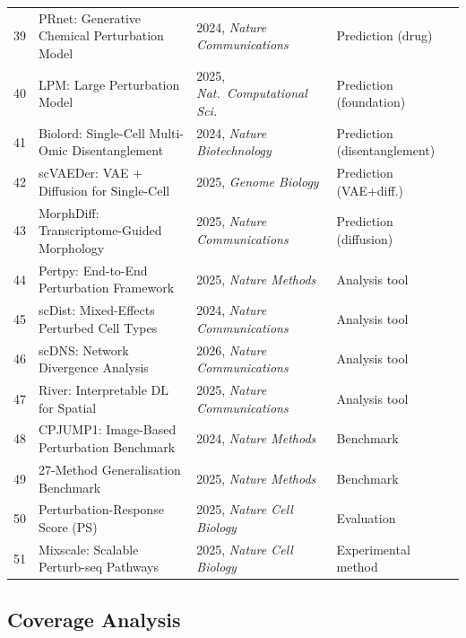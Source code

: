\documentclass[12pt, a4paper]{article}
\begin{document}
\begin{longtable}{@{}p{0.5cm}p{5.4cm}p{3.2cm}p{3.6cm}@{}}
39 & PRnet: Generative Chemical Perturbation Model & 2024, \textit{Nature Communications} & Prediction (drug) \\
40 & LPM: Large Perturbation Model                 & 2025, \textit{Nat.\ Computational Sci.} & Prediction (foundation) \\
41 & Biolord: Single-Cell Multi-Omic Disentanglement & 2024, \textit{Nature Biotechnology} & Prediction (disentanglement) \\
42 & scVAEDer: VAE $+$ Diffusion for Single-Cell   & 2025, \textit{Genome Biology}        & Prediction (VAE+diff.) \\
43 & MorphDiff: Transcriptome-Guided Morphology    & 2025, \textit{Nature Communications} & Prediction (diffusion) \\
44 & Pertpy: End-to-End Perturbation Framework     & 2025, \textit{Nature Methods}        & Analysis tool \\
45 & scDist: Mixed-Effects Perturbed Cell Types    & 2024, \textit{Nature Communications} & Analysis tool \\
46 & scDNS: Network Divergence Analysis            & 2026, \textit{Nature Communications} & Analysis tool \\
47 & River: Interpretable DL for Spatial           & 2025, \textit{Nature Communications} & Analysis tool \\
48 & CPJUMP1: Image-Based Perturbation Benchmark   & 2024, \textit{Nature Methods}        & Benchmark \\
49 & 27-Method Generalisation Benchmark            & 2025, \textit{Nature Methods}        & Benchmark \\
50 & Perturbation-Response Score (PS)              & 2025, \textit{Nature Cell Biology}   & Evaluation \\
51 & Mixscale: Scalable Perturb-seq Pathways       & 2025, \textit{Nature Cell Biology}   & Experimental method \\
\end{longtable}

\subsection{Coverage Analysis}
\end{document}
